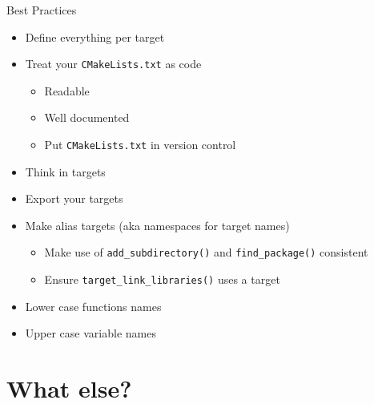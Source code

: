 \documentclass[t]{beamer}
\begin{document}
\begin{frame}{Best Practices}
    \begin{itemize}
        \item Define everything per target
        \item Treat your \texttt{CMakeLists.txt} as code
            \begin{itemize}
                \item Readable
                \item Well documented
                \item Put \texttt{CMakeLists.txt} in version control
            \end{itemize}
        \item Think in targets
        \item Export your targets
        \item Make alias targets (aka namespaces for target names)
            \begin{itemize}
                \item Make use of \texttt{add\_subdirectory()} and
                    \texttt{find\_package()} consistent
                \item Ensure \texttt{target\_link\_libraries()} uses a
                    target
            \end{itemize}
        \item Lower case functions names
        \item Upper case variable names
    \end{itemize}
\end{frame}

\section*{What else?}

\end{document}
